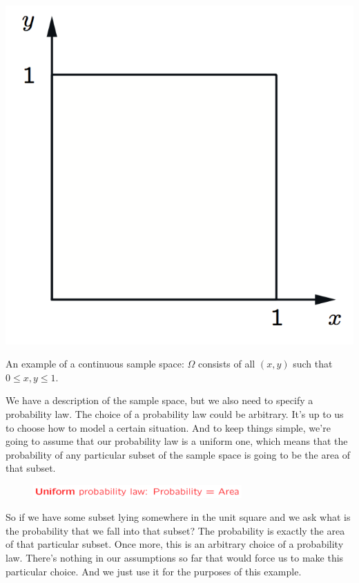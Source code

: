 \documentclass{tufte-handout}
\begin{document}
\begin{marginfigure}
  \includegraphics{ContSampleSpace}
  \caption{An example of a continuous sample space: $\Omega$ consists of all $(x, y)$ such that $0 \leq x, y \leq 1$.}
\end{marginfigure}


We have a description of the sample space, but we also need to
specify a probability law. The choice of a probability law could be arbitrary. It's up to us to choose how to model a
certain situation. And to keep things simple, we're going to assume that our probability law is a uniform
one, which means that the probability of any particular subset of the sample space is going to be the
area of that subset.

\begin{figure}
  \includegraphics[width=8cm]{UniformLaw}
\end{figure}


So if we have some subset lying somewhere in the unit square and we ask what is the probability that we fall into
that subset? The probability is exactly the area of that particular subset. Once more, this is an arbitrary
choice of a probability law. There's nothing in our assumptions so far that would force us to make this
particular choice. And we just use it for the purposes of this example.
\end{document}
